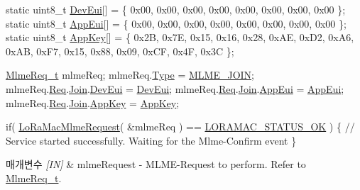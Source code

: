 \begin{DoxyCode}
\textcolor{keyword}{static} uint8\_t \mbox{\hyperlink{lora_8c_a559e145046915c83d8d4cd1034dcd48d}{DevEui}}[] =
\{
  0x00, 0x00, 0x00, 0x00, 0x00, 0x00, 0x00, 0x00
\};
\textcolor{keyword}{static} uint8\_t \mbox{\hyperlink{lora_8c_aeb7c5cb4ee9f2d92b3ee178bce539626}{AppEui}}[] =
\{
  0x00, 0x00, 0x00, 0x00, 0x00, 0x00, 0x00, 0x00
\};
\textcolor{keyword}{static} uint8\_t \mbox{\hyperlink{lora_8c_a6456b5f4ecdf15e4968b32065d48e2d2}{AppKey}}[] =
\{
  0x2B, 0x7E, 0x15, 0x16, 0x28, 0xAE, 0xD2, 0xA6,
  0xAB, 0xF7, 0x15, 0x88, 0x09, 0xCF, 0x4F, 0x3C
\};

\mbox{\hyperlink{structs_mlme_req}{MlmeReq\_t}} mlmeReq;
mlmeReq.\mbox{\hyperlink{structs_mlme_req_a83b9239b834fa1a95fba118c0a392a8b}{Type}} = \mbox{\hyperlink{group___l_o_r_a_m_a_c_gga320f4c08fe99747b08463689be624f7ba475ad5dea1c4c13b93b31095c665e92e}{MLME\_JOIN}};
mlmeReq.\mbox{\hyperlink{structs_mlme_req_ae8fae82634858192f75515c1b7daaadc}{Req}}.\mbox{\hyperlink{unions_mlme_req_1_1u_mlme_param_a172a908e5643a97e1e911d97d8b2c363}{Join}}.\mbox{\hyperlink{structs_mlme_req_join_a2aa72c6d37233b51e7ae46f85398f888}{DevEui}} = \mbox{\hyperlink{lora_8c_a559e145046915c83d8d4cd1034dcd48d}{DevEui}};
mlmeReq.\mbox{\hyperlink{structs_mlme_req_ae8fae82634858192f75515c1b7daaadc}{Req}}.\mbox{\hyperlink{unions_mlme_req_1_1u_mlme_param_a172a908e5643a97e1e911d97d8b2c363}{Join}}.\mbox{\hyperlink{structs_mlme_req_join_a9bef8882015afeb26d9a7fb5d601df96}{AppEui}} = \mbox{\hyperlink{lora_8c_aeb7c5cb4ee9f2d92b3ee178bce539626}{AppEui}};
mlmeReq.\mbox{\hyperlink{structs_mlme_req_ae8fae82634858192f75515c1b7daaadc}{Req}}.\mbox{\hyperlink{unions_mlme_req_1_1u_mlme_param_a172a908e5643a97e1e911d97d8b2c363}{Join}}.\mbox{\hyperlink{structs_mlme_req_join_a560c2bd9214ee75105acac8593614bd9}{AppKey}} = \mbox{\hyperlink{lora_8c_a6456b5f4ecdf15e4968b32065d48e2d2}{AppKey}};

\textcolor{keywordflow}{if}( \mbox{\hyperlink{group___l_o_r_a_m_a_c_ga097113f30feecc17c780940ff74af33e}{LoRaMacMlmeRequest}}( &mlmeReq ) == \mbox{\hyperlink{group___l_o_r_a_m_a_c_gga1d18f26b344040b3ec5c3db662919661a03db5fca052313edb3823c014b653a74}{LORAMAC\_STATUS\_OK}} )
\{
  \textcolor{comment}{// Service started successfully. Waiting for the Mlme-Confirm event}
\}
\end{DoxyCode}



\begin{DoxyParams}{매개변수}
{\em \mbox{[}\+I\+N\mbox{]}} & mlme\+Request -\/ M\+L\+M\+E-\/\+Request to perform. Refer to \mbox{\hyperlink{group___l_o_r_a_m_a_c_ga5a32f5920a7a3d04435c142be7f38b19}{Mlme\+Req\+\_\+t}}.\\
\hline
\end{DoxyParams}

